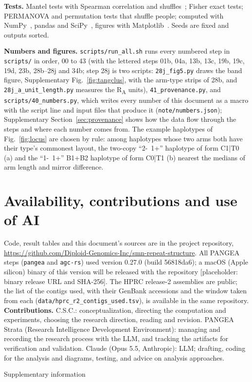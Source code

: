 \documentclass[10pt]{article}
\newcommand{\RU}[1]{R\textsubscript{#1}}%
\begin{document}
\textbf{Tests.} Mantel tests with Spearman correlation and \nPerm{} shuffles~\cite{mantel1967}; Fisher exact tests;
PERMANOVA and permutation tests that shuffle people; computed with NumPy~\cite{harris2020}, pandas and SciPy~\cite{virtanen2020},
figures with Matplotlib~\cite{matplotlib}. Seeds are fixed and outputs sorted.

\textbf{Numbers and figures.} \texttt{scripts/run\_all.sh} runs every numbered step in \texttt{scripts/} in order, 00 to 43 (with the lettered steps 01b, 04a, 13b, 13c, 19b, 19c, 19d, 23b, 28b--28j and 34b; step 28j is two scripts: \texttt{28j\_fig5.py} draws the band figure, Supplementary Fig.~\ref{fig:tangclus}, with the arm-type strips of 28b, and \texttt{28j\_a\_unit\_length.py} measures the \RU{A} units), \texttt{41\_provenance.py}, and \texttt{scripts/40\_numbers.py},
which writes every number of this document as a macro with the script line and input files that produce it
(\texttt{note/numbers.json}); Supplementary Section~\ref{sec:provenance} shows how the data flow through the steps
and where each number comes from. The example haplotypes of Fig.~\ref{fig:locus} are chosen by rule: among haplotypes whose two arms
both have their type's commonest layout, the two-copy ``2-~1+'' haplotype of form C1|T0 (a) and the ``1-~1+'' B1+B2
haplotype of form C0|T1 (b) nearest the medians of arm length and mirror difference.

\section*{Availability, contributions and use of AI}
Code, result tables and this document's sources are in the project repository, \url{https://github.com/Diploid-Genomics-Inc/smn-repeat-structure}. All PANGEA steps (\texttt{pangea} and \texttt{agc-rs}) used version 0.27.0 (build 56818da6); a macOS (Apple silicon) binary of this version will be released with the repository [placeholder: binary release URL and SHA-256]. The HPRC release-2
assemblies are public; the list of the contigs used, with their GenBank accessions and the window taken from each (\texttt{data/hprc\_r2\_contigs\_used.tsv}), is available in the same repository. \textbf{Contributions.} C.S.C.: conceptualization, directing the computation and experiments, choosing the research
direction, reading and revision. PANGEA Strata (Research Intelligence Development Environment): managing and recording the research process
with the LLM, and tracking the artifacts for verification and validation. Claude (Opus 5.5, Anthropic): LLM; drafting,
coding for the analysis and diagrams, testing, and advice on analysis approaches.



\clearpage
\appendix
\renewcommand{\thesection}{S\arabic{section}}
\renewcommand{\thefigure}{S\arabic{figure}}
\renewcommand{\thetable}{S\arabic{table}}
\setcounter{figure}{0}\setcounter{table}{0}
\begin{center}\Large Supplementary information\end{center}

\end{document}
